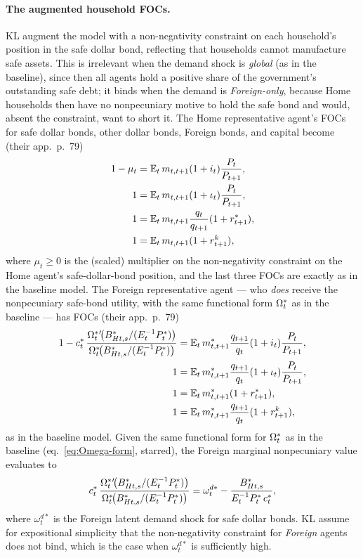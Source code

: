 \paragraph{The augmented household FOCs.} KL augment the model with a
non-negativity constraint on each household's position in the safe dollar bond,
reflecting that households cannot manufacture safe assets. This is irrelevant when
the demand shock is \emph{global} (as in the baseline), since then all agents hold
a positive share of the government's outstanding safe debt; it binds when the
demand is \emph{Foreign-only}, because Home households then have no nonpecuniary
motive to hold the safe bond and would, absent the constraint, want to short it.
The Home representative agent's FOCs for safe dollar bonds, other dollar bonds,
Foreign bonds, and capital become (their app.~p.~79)
\begin{align}
1 - \mu_t &= \mathbb{E}_t\,m_{t,t+1}(1+i_t)\frac{P_t}{P_{t+1}}, \label{eq:b4-home-safe}\\
1 &= \mathbb{E}_t\,m_{t,t+1}(1+\iota_t)\frac{P_t}{P_{t+1}}, \label{eq:b4-home-other}\\
1 &= \mathbb{E}_t\,m_{t,t+1}\frac{q_t}{q_{t+1}}(1+r^{*}_{t+1}), \label{eq:b4-home-fbond}\\
1 &= \mathbb{E}_t\,m_{t,t+1}(1+r^{k}_{t+1}), \label{eq:b4-home-cap}
\end{align}
where $\mu_t\ge0$ is the (scaled) multiplier on the non-negativity constraint on
the Home agent's safe-dollar-bond position, and the last three FOCs are exactly as
in the baseline model. The Foreign representative agent --- who \emph{does} receive
the nonpecuniary safe-bond utility, with the same functional form $\Omega^{*}_t$ as
in the baseline --- has FOCs (their app.~p.~79)
\begin{align}
1 - c^{*}_t\,\frac{\Omega^{*}_t{}'\!\bigl(B^{*}_{Ht,s}/(E_t^{-1}P^{*}_t)\bigr)}
{\Omega^{*}_t\!\bigl(B^{*}_{Ht,s}/(E_t^{-1}P^{*}_t)\bigr)}
&= \mathbb{E}_t\,m^{*}_{t,t+1}\frac{q_{t+1}}{q_t}(1+i_t)\frac{P_t}{P_{t+1}}, \label{eq:b4-foreign-safe}\\
1 &= \mathbb{E}_t\,m^{*}_{t,t+1}\frac{q_{t+1}}{q_t}(1+\iota_t)\frac{P_t}{P_{t+1}}, \label{eq:b4-foreign-other}\\
1 &= \mathbb{E}_t\,m^{*}_{t,t+1}(1+r^{*}_{t+1}), \label{eq:b4-foreign-fbond}\\
1 &= \mathbb{E}_t\,m^{*}_{t,t+1}\frac{q_{t+1}}{q_t}(1+r^{k}_{t+1}), \label{eq:b4-foreign-cap}
\end{align}
as in the baseline model. Given the same functional form for $\Omega^{*}_t$ as in
the baseline (eq.~\eqref{eq:Omega-form}, starred), the Foreign marginal
nonpecuniary value evaluates to
\begin{equation}
c^{*}_t\,\frac{\Omega^{*}_t{}'\!\bigl(B^{*}_{Ht,s}/(E_t^{-1}P^{*}_t)\bigr)}
{\Omega^{*}_t\!\bigl(B^{*}_{Ht,s}/(E_t^{-1}P^{*}_t)\bigr)}
= \omega^{d*}_t - \frac{B^{*}_{Ht,s}}{E_t^{-1}P^{*}_t\,c^{*}_t}, \label{eq:b4-foreign-wedge}
\end{equation}
where $\omega^{d*}_t$ is the Foreign latent demand shock for safe dollar bonds. KL
assume for expositional simplicity that the non-negativity constraint for
\emph{Foreign} agents does not bind, which is the case when $\omega^{d*}_t$ is
sufficiently high.

